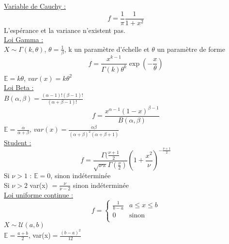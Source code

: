 \documentclass[../main.tex]{subfiles}
\begin{document}
\quad \underline{Variable de Cauchy :}\\
\begin{equation}
    f = \frac{1}{\pi} \frac{1}{1+x^2}
\end{equation}
L'espérance et la variance n'existent pas.\\

\quad \underline{Loi Gamma :}\\
$X\sim \Gamma (k, \theta)$, $\theta = \frac{1}{\beta}$, k un paramètre d'échelle et $\theta$ un paramètre de forme\\
\begin{equation}
    f = \frac{x^{k-1}}{\Gamma(k) \theta^k} \exp(-\frac{x}{\theta})
\end{equation}
$\mathbb{E} = k\theta$, $var(x) = k\theta^2$\\

\quad \underline{Loi Beta :}\\
$B(\alpha, \beta) = \frac{(\alpha-1)! (\beta-1)!}{(\alpha+\beta-1)!}$\\
\begin{equation}
    f = \frac{x^{\alpha-1} (1-x)^{\beta-1}}{B(\alpha, \beta)}
\end{equation}
$\mathbb{E} = \frac{\alpha}{\alpha+\beta}$, $var(x) = \frac{\alpha \beta}{(\alpha+\beta)^2(\alpha+\beta+1)}$\\

\quad \underline{Student :}\\
\begin{equation}
    f = \frac{\Gamma(\frac{\nu+1}{2}}{\sqrt{\nu \pi}\Gamma(\frac{\nu}{2})} (1+\frac{x^2}{\nu})^{-\frac{\nu+1}{2}}
\end{equation}
Si $\nu >1$ : $\mathbb{E} = 0$, sinon indéterminée\\
Si $\nu > 2$ var(x) $=\frac{\nu}{\nu-2}$ sinon indéterminée\\

\quad \underline{Loi uniforme continue :}\\
\begin{equation}
    f = \left\{
    \begin{array}{cc}
        \frac{1}{b-a} & a\leq x\leq b \\
        0 & \textrm{sinon}\\
    \end{array}
    \right.
\end{equation}
$X\sim \mathcal{U}(a,b)$\\
$\mathbb{E} = \frac{a+b}{2}$, var(x)$=\frac{(b-a)^2}{12}$\\
\end{document}
